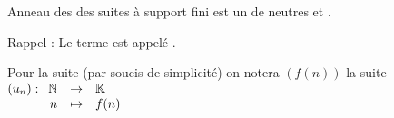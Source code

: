\documentclass[12pt,a4paper]{report}
\begin{document}
    
    \begin{proposition}{Anneau des des suites à support fini}{}
     est un  de neutres  et .
    \end{proposition}
    
    \begin{remarque}
    Rappel : Le terme  est appelé .
    \end{remarque}
    
    \begin{remarque}
    Pour la suite (par soucis de simplicité) on notera $(f(n))$ la suite $(u_n) : \begin{array}[t]{rcl} \mathbb{N} & \rightarrow & \mathbb{K} \\ n & \mapsto & f(n) \end{array}$
    \end{remarque}
    
\end{document}
